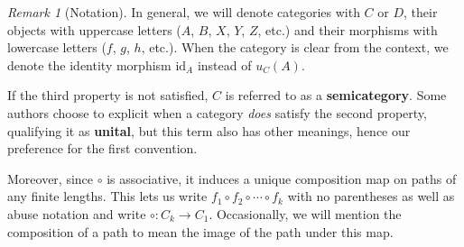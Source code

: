 \documentclass{article}
\theoremstyle{definition}
\theoremstyle{remark}
\newtheorem{rem}[thm]{Remark}
\newcommand{\id}{\text{id}}
\begin{document}
\begin{rem}[Notation]
	In general, we will denote categories with $C$ or $D$, their objects with uppercase letters ($A$, $B$, $X$, $Y$, $Z$, etc.) and their morphisms with lowercase letters ($f$, $g$, $h$, etc.). When the category is clear from the context, we denote the identity morphism $\id_A$ instead of $u_C(A)$.
\end{rem}
If the third property is not satisfied, $C$ is referred to as a \textbf{semicategory}. Some authors choose to explicit when a category \textit{does} satisfy the second property, qualifying it as \textbf{unital}, but this term also has other meanings, hence our preference for the first convention.

Moreover, since $\circ$ is associative, it induces a unique composition map on paths of any finite lengths. This lets us write $f_1 \circ f_2 \circ \cdots \circ f_k$ with no parentheses as well as abuse notation and write $\circ: C_k \rightarrow C_1$. Occasionally, we will mention the composition of a path to mean the image of the path under this map.
\end{document}
